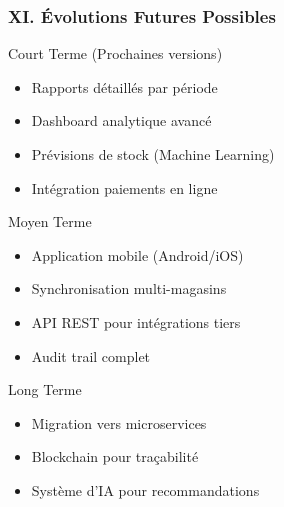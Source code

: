 \documentclass[11pt, aspectratio=169]{beamer}
\begin{document}
\begin{frame}
    \frametitle{XI. Évolutions Futures Possibles}
    
    \begin{block}{Court Terme (Prochaines versions)}
        \begin{itemize}
            \item[\faArrowRight] Rapports détaillés par période
            \item[\faArrowRight] Dashboard analytique avancé
            \item[\faArrowRight] Prévisions de stock (Machine Learning)
            \item[\faArrowRight] Intégration paiements en ligne
        \end{itemize}
    \end{block}
    
    \vspace{0.8cm}
    
    \begin{block}{Moyen Terme}
        \begin{itemize}
            \item[\faArrowRight] Application mobile (Android/iOS)
            \item[\faArrowRight] Synchronisation multi-magasins
            \item[\faArrowRight] API REST pour intégrations tiers
            \item[\faArrowRight] Audit trail complet
        \end{itemize}
    \end{block}
    
    \vspace{0.8cm}
    
    \begin{block}{Long Terme}
        \begin{itemize}
            \item[\faArrowRight] Migration vers microservices
            \item[\faArrowRight] Blockchain pour traçabilité
            \item[\faArrowRight] Système d'IA pour recommandations
        \end{itemize}
    \end{block}
\end{frame}

\end{document}
